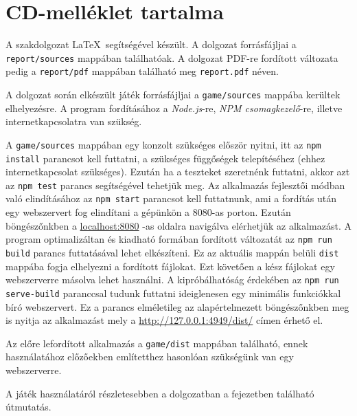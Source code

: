 \newpage

\section*{CD-melléklet tartalma}

A szakdolgozat \LaTeX\ segítségével készült. A dolgozat forrásfájljai a \texttt{report/sources} mappában találhatóak.
A dolgozat PDF-re fordított változata pedig a \texttt{report/pdf} mappában található meg \texttt{report.pdf} néven.

A dolgozat során elkészült játék forrásfájljai a \texttt{game/sources} mappába kerültek elhelyezésre.
A program fordításához a \textit{Node.js}-re, \textit{NPM csomagkezelő}-re, illetve internetkapcsolatra van szükség.

A \texttt{game/sources} mappában egy konzolt szükséges először nyitni, itt az \texttt{npm install} parancsot kell futtatni, a szükséges függőségek telepítéséhez (ehhez internetkapcsolat szükséges).
Ezután ha a teszteket szeretnénk futtatni, akkor azt az \texttt{npm test} parancs segítségével tehetjük meg.
Az alkalmazás fejlesztői módban való elindításához az \texttt{npm start} parancsot kell futtatnunk, ami a fordítás után egy webszervert fog elindítani a gépünkön a $8080$-as porton. Ezután böngészőnkben a \url{localhost:8080} -as oldalra navigálva elérhetjük az alkalmazást.
A program optimalizáltan és kiadható formában fordított változatát az \texttt{npm run build} parancs futtatásával lehet elkészíteni. Ez az aktuális mappán belüli \texttt{dist} mappába fogja elhelyezni a fordított fájlokat. Ezt követően a kész fájlokat egy webszerverre másolva lehet használni. A kipróbálhatóság érdekében az \texttt{npm run serve-build} paranccsal tudunk futtatni ideiglenesen egy minimális funkciókkal bíró webszervert. Ez a parancs elméletileg az alapértelmezett böngészőnkben meg is nyitja az alkalmazást mely a \url{http://127.0.0.1:4949/dist/} címen érhető el.

Az előre lefordított alkalmazás a \texttt{game/dist} mappában található, ennek használatához előzőekben említetthez hasonlóan szükségünk van egy webszerverre.

A játék használatáról részletesebben a dolgozatban a  fejezetben található útmutatás.
